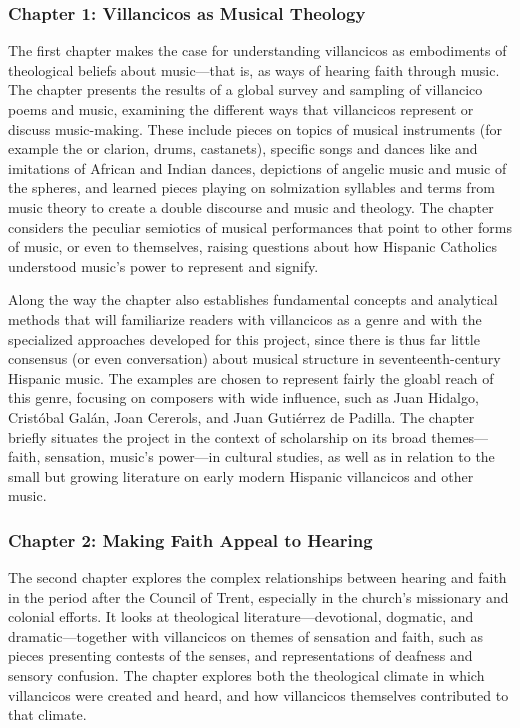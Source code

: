 \documentclass[tt]{vcbook-proposal}
\begin{document}
\subsubsection{Chapter 1: Villancicos as Musical Theology}

The first chapter makes the case for understanding villancicos as embodiments of theological beliefs about music---that is, as ways of hearing faith through music.
The chapter presents the results of a global survey and sampling of villancico poems and music, examining the different ways that villancicos represent or discuss music-making.
These include pieces on topics of musical instruments (for example the  or clarion, drums, castanets), specific songs and dances like  and imitations of African and Indian dances, depictions of angelic music and music of the spheres, and learned pieces playing on solmization syllables and terms from music theory to create a double discourse and music and theology.
The chapter considers the peculiar semiotics of musical performances that point to other forms of music, or even to themselves, raising questions about how Hispanic Catholics understood music's power to represent and signify.

Along the way the chapter also establishes fundamental concepts and analytical methods that will familiarize readers with villancicos as a genre and with the specialized approaches developed for this project, since there is thus far little consensus (or even conversation) about musical structure in seventeenth-century Hispanic music.
The examples are chosen to represent fairly the gloabl reach of this genre, focusing on composers with wide influence, such as Juan Hidalgo, Cristóbal Galán, Joan Cererols, and Juan Gutiérrez de Padilla.
The chapter briefly situates the project in the context of scholarship on its broad themes---faith, sensation, music's power---in cultural studies, as well as in relation to the small but growing literature on early modern Hispanic villancicos and other music.

\subsubsection{Chapter 2: Making Faith Appeal to Hearing}

The second chapter explores the complex relationships between hearing and faith in the period after the Council of Trent, especially in the church's missionary and colonial efforts.
It looks at theological literature---devotional, dogmatic, and dramatic---together with villancicos on themes of sensation and faith, such as pieces presenting contests of the senses, and representations of deafness and sensory confusion.
The chapter explores both the theological climate in which villancicos were created and heard, and how villancicos themselves contributed to that climate.
\end{document}
